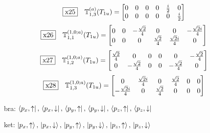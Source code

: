 \documentclass[fleqn,10pt,landscape]{jsarticle}
\begin{document}
\begin{dmath*}
\fbox{x25}\quad \mathbb{T}_{1,3}^{(a)}(T_{1u})=\begin{bmatrix} 0 & 0 & 0 & 0 & \frac{i}{2} & 0 \\ 0 & 0 & 0 & 0 & 0 & \frac{i}{2} \end{bmatrix}
\end{dmath*}
\begin{dmath*}
\fbox{x26}\quad \mathbb{T}_{1,1}^{(1,0;a)}(T_{1u})=\begin{bmatrix} 0 & 0 & - \frac{\sqrt{2}}{4} & 0 & 0 & - \frac{\sqrt{2} i}{4} \\ 0 & 0 & 0 & \frac{\sqrt{2}}{4} & \frac{\sqrt{2} i}{4} & 0 \end{bmatrix}
\end{dmath*}
\begin{dmath*}
\fbox{x27}\quad \mathbb{T}_{1,2}^{(1,0;a)}(T_{1u})=\begin{bmatrix} \frac{\sqrt{2}}{4} & 0 & 0 & 0 & 0 & - \frac{\sqrt{2}}{4} \\ 0 & - \frac{\sqrt{2}}{4} & 0 & 0 & - \frac{\sqrt{2}}{4} & 0 \end{bmatrix}
\end{dmath*}
\begin{dmath*}
\fbox{x28}\quad \mathbb{T}_{1,3}^{(1,0;a)}(T_{1u})=\begin{bmatrix} 0 & \frac{\sqrt{2} i}{4} & 0 & \frac{\sqrt{2}}{4} & 0 & 0 \\ - \frac{\sqrt{2} i}{4} & 0 & \frac{\sqrt{2}}{4} & 0 & 0 & 0 \end{bmatrix}
\end{dmath*}
\vspace{5mm}

\noindent\textbullet\, bra: $\bra{p_{x},\uparrow},\, \bra{p_{x},\downarrow},\, \bra{p_{y},\uparrow},\, \bra{p_{y},\downarrow},\, \bra{p_{z},\uparrow},\, \bra{p_{z},\downarrow}$

\noindent\textbullet\, ket: $\ket{p_{x},\uparrow},\, \ket{p_{x},\downarrow},\, \ket{p_{y},\uparrow},\, \ket{p_{y},\downarrow},\, \ket{p_{z},\uparrow},\, \ket{p_{z},\downarrow}$
\end{document}
